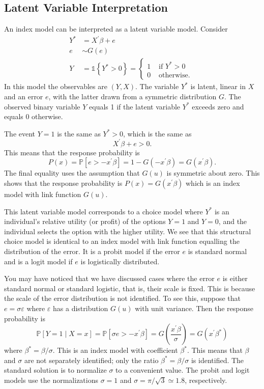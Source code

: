 \documentclass[10pt]{article}
\begin{document}
\subsection{Latent Variable Interpretation}
An index model can be interpreted as a latent variable model. Consider
$$
\begin{aligned}
Y^{*} &=X^{\prime} \beta+e \\
e & \sim G(e) \\
Y &=\mathbb{1}\left\{Y^{*}>0\right\}=\left\{\begin{array}{cc}
1 & \text { if } Y^{*}>0 \\
0 & \text { otherwise. }
\end{array}\right.
\end{aligned}
$$
In this model the observables are $(Y, X)$. The variable $Y^{*}$ is latent, linear in $X$ and an error $e$, with the latter drawn from a symmetric distribution $G$. The observed binary variable $Y$ equals 1 if the latent variable $Y^{*}$ exceeds zero and equals 0 otherwise.

The event $Y=1$ is the same as $Y^{*}>0$, which is the same as
$$
X^{\prime} \beta+e>0 .
$$
This means that the response probability is
$$
P(x)=\mathbb{P}\left[e>-x^{\prime} \beta\right]=1-G\left(-x^{\prime} \beta\right)=G\left(x^{\prime} \beta\right) .
$$
The final equality uses the assumption that $G(u)$ is symmetric about zero. This shows that the response probability is $P(x)=G\left(x^{\prime} \beta\right)$ which is an index model with link function $G(u)$.

This latent variable model corresponds to a choice model where $Y^{*}$ is an individual's relative utility (or profit) of the options $Y=1$ and $Y=0$, and the individual selects the option with the higher utility. We see that this structural choice model is identical to an index model with link function equalling the distribution of the error. It is a probit model if the error $e$ is standard normal and is a logit model if $e$ is logistically distributed.

You may have noticed that we have discussed cases where the error $e$ is either standard normal or standard logistic, that is, their scale is fixed. This is because the scale of the error distribution is not identified. To see this, suppose that $e=\sigma \varepsilon$ where $\varepsilon$ has a distribution $G(u)$ with unit variance. Then the response probability is
$$
\mathbb{P}[Y=1 \mid X=x]=\mathbb{P}\left[\sigma e>-x^{\prime} \beta\right]=G\left(\frac{x^{\prime} \beta}{\sigma}\right)=G\left(x^{\prime} \beta^{*}\right)
$$
where $\beta^{*}=\beta / \sigma$. This is an index model with coefficient $\beta^{*}$. This means that $\beta$ and $\sigma$ are not separately identified; only the ratio $\beta^{*}=\beta / \sigma$ is identified. The standard solution is to normalize $\sigma$ to a convenient value. The probit and logit models use the normalizations $\sigma=1$ and $\sigma=\pi / \sqrt{3} \simeq 1.8$, respectively.
\end{document}
